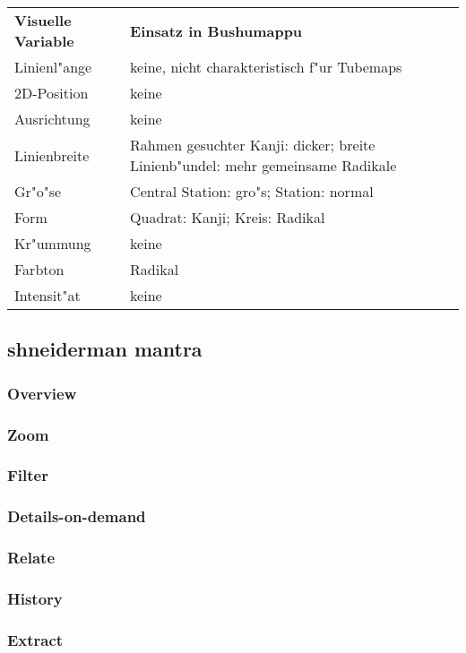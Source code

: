 \begin{table}[h]
\begin{tabular}{ll}

\textbf{Visuelle Variable} & \textbf{Einsatz in Bushumappu}                                                          \\
Linienl"ange       & keine, nicht charakteristisch f"ur Tubemaps                                    \\
2D-Position       & keine                                                                          \\
Ausrichtung       & keine                                                                          \\
Linienbreite      & Rahmen gesuchter Kanji: dicker; breite Linienb"undel: mehr gemeinsame Radikale \\
Gr"o"se             & Central Station: gro"s; Station: normal                                       \\
Form              & Quadrat: Kanji; Kreis: Radikal                                                 \\
Kr"ummung         & keine                                                                          \\
Farbton           & Radikal                                                                        \\
Intensit"at       & keine                                                                          \\
\end{tabular}
\end{table}

\subsection{shneiderman mantra}
\subsubsection{Overview}
\subsubsection{Zoom}
\subsubsection{Filter}
\subsubsection{Details-on-demand}
\subsubsection{Relate}
\subsubsection{History}
\subsubsection{Extract}
